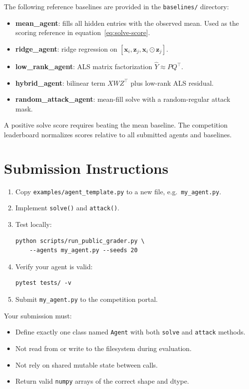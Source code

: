 \documentclass[11pt,a4paper]{article}
\begin{document}
The following reference baselines are provided in the \texttt{baselines/} directory:

\begin{itemize}
  \item \textbf{mean\_agent}: fills all hidden entries with the observed mean.
        Used as the scoring reference in equation~\eqref{eq:solve-score}.
  \item \textbf{ridge\_agent}: ridge regression on $[\mathbf{x}_i, \mathbf{z}_j, \mathbf{x}_i \odot \mathbf{z}_j]$.
  \item \textbf{low\_rank\_agent}: ALS matrix factorization $\hat{Y} \approx P Q^\top$.
  \item \textbf{hybrid\_agent}: bilinear term $X W Z^\top$ plus low-rank ALS residual.
  \item \textbf{random\_attack\_agent}: mean-fill solve with a random-regular attack mask.
\end{itemize}

A positive solve score requires beating the mean baseline.
The competition leaderboard normalizes scores relative to all submitted agents and baselines.

\section{Submission Instructions}

\begin{enumerate}
  \item Copy \texttt{examples/agent\_template.py} to a new file, e.g.\ \texttt{my\_agent.py}.
  \item Implement \texttt{solve()} and \texttt{attack()}.
  \item Test locally:
    \begin{lstlisting}
python scripts/run_public_grader.py \
    --agents my_agent.py --seeds 20
    \end{lstlisting}
  \item Verify your agent is valid:
    \begin{lstlisting}
pytest tests/ -v
    \end{lstlisting}
  \item Submit \texttt{my\_agent.py} to the competition portal.
\end{enumerate}

Your submission must:
\begin{itemize}
  \item Define exactly one class named \texttt{Agent} with both \texttt{solve} and \texttt{attack} methods.
  \item Not read from or write to the filesystem during evaluation.
  \item Not rely on shared mutable state between calls.
  \item Return valid \texttt{numpy} arrays of the correct shape and dtype.
\end{itemize}
\end{document}
